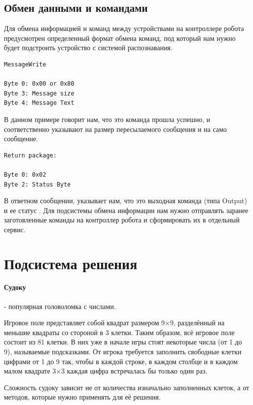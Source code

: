 \subsection{Обмен данными и командами}

Для обмена информацией и команд между устройствами на контроллере робота предусмотрен определенный формат обмена команд, под который нам нужно будет подстроить устройство с системой распознавания.

\begin{lstlisting}[caption={Формат команд для получения потока данных}, label=lst:analyt1]
MessageWrite

Byte 0: 0x00 or 0x80
Byte 3: Message size
Byte 4: Message Text
\end{lstlisting}
В данном примере  говорит нам, что это команда прошла успешно,  и  соответственно указывают на размер пересылаемого сообщения и на само сообщение.

\begin{lstlisting}[caption={Формат команды ответа}, label=lst:analyt2]
Return package:

Byte 0: 0x02
Byte 2: Status Byte
\end{lstlisting}
В ответном сообщении,  указывает нам, что это выходная команда (типа Output) и ее статус .
Для подсистемы обмена информации нам нужно отправлять заранее заготовленные команды на контроллер робота и сформировать их в отдельный сервис.

\section{Подсистема решения}

\paragraph{Судоку} - популярная головоломка с числами.

Игровое поле представляет собой квадрат размером 9×9, разделённый на меньшие квадраты со стороной в 3 клетки. Таким образом, всё игровое поле состоит из 81 клетки. В них уже в начале игры стоят некоторые числа (от 1 до 9), называемые подсказками. От игрока требуется заполнить свободные клетки цифрами от 1 до 9 так, чтобы в каждой строке, в каждом столбце и в каждом малом квадрате 3×3 каждая цифра встречалась бы только один раз.

Сложность судоку зависит не от количества изначально заполненных клеток, а от методов, которые нужно применять для её решения.

